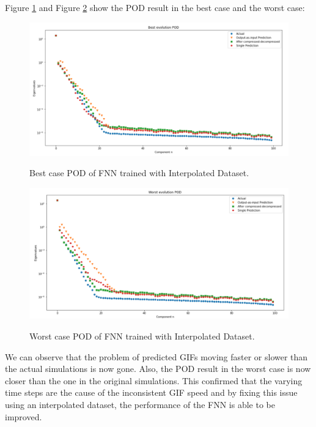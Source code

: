 Figure \ref{figure:FNN_interpolated_best_POD} and Figure \ref{figure:FNN_interpolated_worst_POD} show the POD result in the best case and the worst case:

\begin{figure}[H]
    \caption{Best case POD of FNN trained with Interpolated Dataset.}
    \includegraphics[scale=0.5]{figures/mantle_convection_images/larger_dataset_interpolated/FNN_Best_POD.png}
    \label{figure:FNN_interpolated_best_POD}
\end{figure}

\begin{figure}[H]
    \caption{Worst case POD of FNN trained with Interpolated Dataset.}
    \includegraphics[scale=0.5]{figures/mantle_convection_images/larger_dataset_interpolated/FNN_Worst_POD.png}
    \label{figure:FNN_interpolated_worst_POD}
\end{figure}

We can observe that the problem of predicted GIFs moving faster or slower than the actual simulations is now gone. Also, the POD result in the worst case is now closer than the one in the original simulations. This confirmed that the varying time steps are the cause of the inconsistent GIF speed and by fixing this issue using an interpolated dataset, the performance of the FNN is able to be improved.


